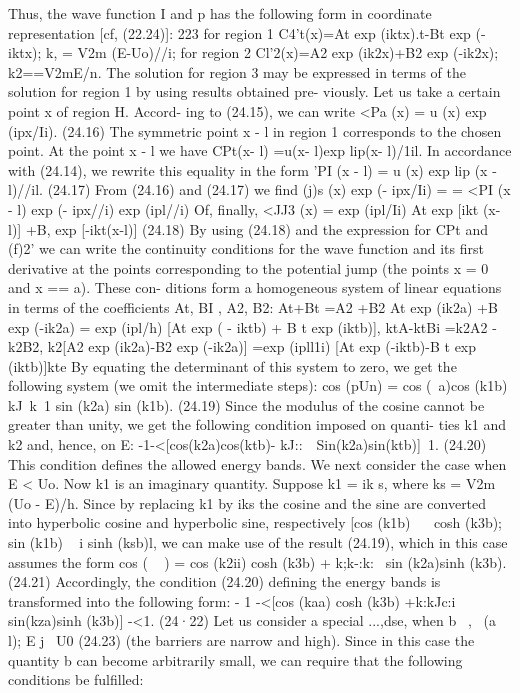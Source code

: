 \documentclass[a4paper,sfsidenotes,colorlinks=true]{tufte-book}
\numberwithin{equation}{section}
\numberwithin{figure}{section}
\begin{document}
{{{{{Thus, the wave function I and p has the following form in coordinate representation [cf, (22.24)]:
223
for region 1 C4't(x)=At exp (iktx).t-Bt exp (-iktx);
k, = V2m (E-Uo)//i; for region 2
Cl'2(x)=A2 exp (ik2x)+B2 exp (-ik2x); k2==V2mE/n.
The solution for region 3 may be expressed in terms of the solution for region 1 by using results obtained pre- viously. Let us take a certain point x of region H. Accord- ing to (24.15), we can write
<Pa (x) = u (x) exp (ipx/Ii).	(24.16) The symmetric point x - l in region 1 corresponds to
the chosen point. At the point x - l we have CPt(x- l) =u(x- l)exp lip(x- l)/1il.
In accordance with (24.14), we rewrite this equality in the form
'PI (x - l) = u (x) exp lip (x - l)//il.	(24.17) From (24.16) and (24.17) we find (j)s (x) exp (- ipx/Ii) =
= <PI (x - l) exp (- ipx//i) exp (ipl//i) Of, finally, <JJ3 (x) = exp	(ipl/Ii) {At	exp	[ikt (x-l)]
+B, exp [-ikt(x-l)]}	(24.18)
By using (24.18) and the expression for CPt and (f)2' we can write the continuity conditions for the wave function and its first derivative at the points corresponding to the potential jump (the points x = 0 and x == a). These con- ditions form a homogeneous system of linear equations in terms of the coefficients At, BI , A2, B2:
At+Bt =A2 +B2 At	exp	(ik2a) +B	exp	(-ik2a)
= exp	(ipl/h) [At	exp	( - iktb) + B t	exp	(iktb)], ktA-ktBi =k2A2 -k2B2,
k2[A2 exp (ik2a)-B2 exp (-ik2a)] =exp	(ipll1i) [At	exp	(-iktb)-B t	exp	(iktb)]kte
By equating the determinant of this system to zero, we get the following system (we omit the intermediate steps):
cos (pUn) = cos (~a)cos (k1b)	kJ~k~1 sin (k2a) sin (k1b). (24.19)
Since the modulus of the cosine cannot be greater than unity, we get the following condition imposed on quanti- ties k1 and k2 and, hence, on E:
-1-<[cos(k2a)cos(ktb)- kJ::~~Sin(k2a)sin(ktb)]~1. (24.20)
This condition defines the allowed energy bands. We next consider the case when E < Uo. Now k1 is an imaginary quantity. Suppose k1 = ik s,
where ks = V2m (Uo - E)/h. Since by replacing k1 by iks the cosine and the sine are converted into hyperbolic cosine and hyperbolic sine, respectively [cos (k1b) ~ ~cosh (k3b); sin (k1b) ~ i sinh (ksb)l, we can make use of the result (24.19), which in this case assumes the form
cos ( ~ ) = cos (k2ii) cosh (k3b) + k;k-:k:~ sin (k2a)sinh (k3b).	(24.21)
Accordingly, the condition (24.20) defining the energy bands is transformed into the following form:
- 1 -<[cos (kaa) cosh (k3b) +k:kJc:i sin(kza)sinh (k3b)] -<1.	(24·22)
Let us consider a special ...,dse, when
b ~,~ (a ~ l); E j~ U0	(24.23)
(the barriers are narrow and high). Since in this case the quantity b can become arbitrarily small, we can require that the following conditions be fulfilled:
}}}}}
\end{document}
